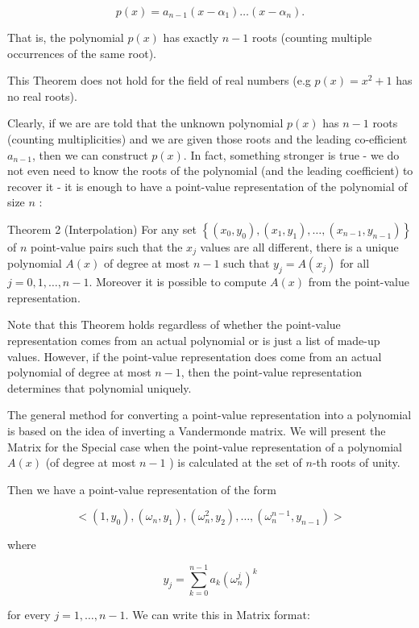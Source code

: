 $$
p(x)=a_{n-1}\left(x-\alpha_{1}\right) \ldots\left(x-\alpha_{n}\right) .
$$

That is, the polynomial $p(x)$ has exactly $n-1$ roots (counting multiple occurrences of the same root).

This Theorem does not hold for the field of real numbers (e.g $p(x)=x^{2}+1$ has no real roots).

Clearly, if we are are told that the unknown polynomial $p(x)$ has $n-1$ roots (counting multiplicities) and we are given those roots and the leading co-efficient $a_{n-1}$, then we can construct $p(x)$. In fact, something stronger is true - we do not even need to know the roots of the polynomial (and the leading coefficient) to recover it - it is enough to have a point-value representation of the polynomial of size $n$ :

Theorem 2 (Interpolation) For any set $\left\{\left(x_{0}, y_{0}\right),\left(x_{1}, y_{1}\right), \ldots,\left(x_{n-1}, y_{n-1}\right)\right\}$ of $n$ point-value pairs such that the $x_{j}$ values are all different, there is a unique polynomial $A(x)$ of degree at most $n-1$ such that $y_{j}=A\left(x_{j}\right)$ for all $j=0,1, \ldots, n-1$. Moreover it is possible to compute $A(x)$ from the point-value representation.

Note that this Theorem holds regardless of whether the point-value representation comes from an actual polynomial or is just a list of made-up values. However, if the point-value representation does come from an actual polynomial of degree at most $n-1$, then the point-value representation determines that polynomial uniquely.

The general method for converting a point-value representation into a polynomial is based on the idea of inverting a Vandermonde matrix. We will present the Matrix for the Special case when the point-value representation of a polynomial $A(x)$ (of degree at most $n-1$ ) is calculated at the set of $n$-th roots of unity.

Then we have a point-value representation of the form

$$
<\left(1, y_{0}\right),\left(\omega_{n}, y_{1}\right),\left(\omega_{n}^{2}, y_{2}\right), \ldots,\left(\omega_{n}^{n-1}, y_{n-1}\right)>
$$

where

$$
y_{j}=\sum_{k=0}^{n-1} a_{k}\left(\omega_{n}^{j}\right)^{k}
$$

for every $j=1, \ldots, n-1$. We can write this in Matrix format:

